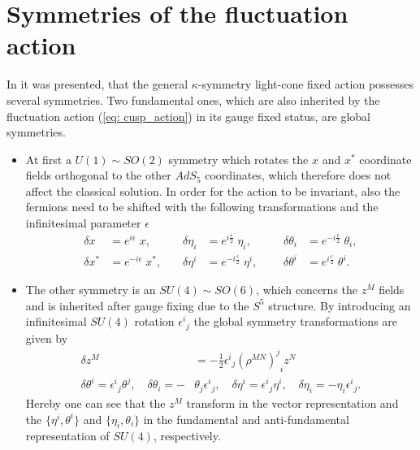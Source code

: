 \section{Symmetries of the fluctuation action}
In \cite{Metsaev:2000yu} it was presented, that the general $\kappa$-symmetry light-cone fixed action possesses several symmetries. Two fundamental ones, which are also inherited by the fluctuation action (\ref{eq: cusp_action}) in its gauge fixed status, are global symmetries.
%
\begin{itemize}
\item At first a $U(1)\sim SO(2)$ symmetry which rotates the $x$ and $x^{*}$ coordinate fields orthogonal to the other $AdS_{5}$ coordinates, which therefore does not affect the classical solution. In order for the action to be invariant, also the fermions need to be shifted with the following transformations and the infinitesimal parameter $\epsilon$
%
%
\begin{equation}
\begin{alignedat}{9}
\delta x &= e^{i\epsilon}\; x, \qquad&  \delta\eta_{i}&= e^{i\frac{\epsilon}{2}}\; \eta_{i}, \qquad&  \delta\theta_{i} &= e^{-i\frac{\epsilon}{2}}\; \theta_{i},\\
\delta x^{*} &= e^{-i\epsilon}\; x^{*}, &  \delta\eta^{i}&= e^{-i\frac{\epsilon}{2}}\; \eta^{i}, &  \delta\theta^{i} &= e^{i\frac{\epsilon}{2}}\; \theta^{i}.
\label{eq: U1_sym}
\end{alignedat}
\end{equation}
%
%
\item The other symmetry is an $SU(4)\sim SO(6)$, which concerns the $z^{M}$ fields and is inherited after gauge fixing due to the $S^{5}$ structure. By introducing an infinitesimal $SU(4)$ rotation ${\epsilon^{i}}_{j}$ the global symmetry transformations are given by
%
%
\begin{equation}
\begin{alignedat}{9}
\delta z^{M} &= -\frac{1}{2} {\epsilon^{i}}_{j} {(\rho^{MN})^{j}}_{i} z^{N}   \\
\delta \theta^{i} = {\epsilon^{i}}_{j} \theta ^{j}, \quad \delta \theta_{i} = -& \theta_{j} {\epsilon^{i}}_{j}, \quad
\delta \eta ^{i} = {\epsilon^{i}}_{j} \eta^{i}, \quad  \delta \eta_{i}= - \eta_{i} {\epsilon^{i}}_{j}.
\end{alignedat}
\end{equation}
%
%
Hereby one can see that the $z^{M}$ transform in the vector representation and the $\lbrace \eta^{i},\theta^{i}\rbrace$ and $\lbrace \eta_{i},\theta_{i}\rbrace$ in the fundamental and anti-fundamental representation of $SU(4)$, respectively.
\end{itemize}
%
%
%
%
%
%
%
%
%
